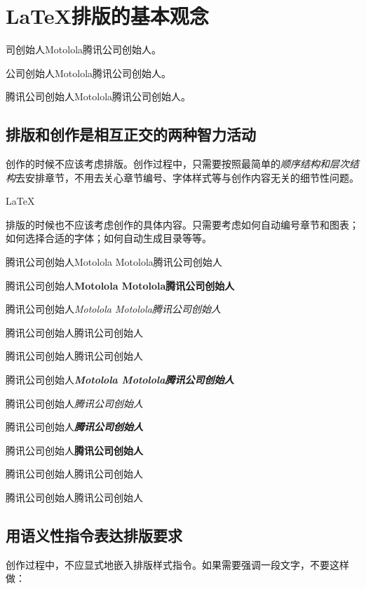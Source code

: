 \section{\LaTeX{}排版的基本观念}


\Warning{}司创始人Motolola腾讯公司创始人。

\Warning{}公司创始人Motolola腾讯公司创始人。

\Warning{}腾讯公司创始人Motolola腾讯公司创始人。

\subsection{排版和创作是相互正交的两种智力活动}
创作的时候不应该考虑排版。创作过程中，只需要按照最简单的\emph{顺序结构和层次结构}去安排章节，不用去关心章节编号、字体样式等与创作内容无关的细节性问题。

\LaTeX

排版的时候也不应该考虑创作的具体内容。只需要考虑如何自动编号章节和图表；如何选择合适的字体；如何自动生成目录等等。

\begingroup
腾讯公司创始人Motolola Motolola腾讯公司创始人

腾讯公司创始人\bfseries{Motolola Motolola}腾讯公司创始人

腾讯公司创始人\itshape{Motolola Motolola}腾讯公司创始人

腾讯公司创始人腾讯公司创始人

腾讯公司创始人腾讯公司创始人

腾讯公司创始人\bfseries\itshape{Motolola Motolola}腾讯公司创始人

腾讯公司创始人\itshape{}腾讯公司创始人

腾讯公司创始人\bfseries\itshape{}腾讯公司创始人

腾讯公司创始人\bfseries{}腾讯公司创始人

腾讯公司创始人腾讯公司创始人

腾讯公司创始人腾讯公司创始人
\endgroup

\subsection{用语义性指令表达排版要求}
\label{subsec:semantics}

创作过程中，不应显式地嵌入排版样式指令。如果需要强调一段文字，不要这样做：

